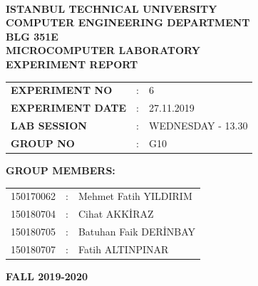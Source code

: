 \documentclass[pdftex,12pt,a4paper]{article}
\begin{document}
\begin{titlepage}
\begin{center}
\textbf{}\\
\textbf{\Large{ISTANBUL TECHNICAL UNIVERSITY}}\\
\vspace{0.5cm}
\textbf{\Large{COMPUTER ENGINEERING DEPARTMENT}}\\
\vspace{2cm}
\textbf{\Large{BLG 351E\\ MICROCOMPUTER LABORATORY\\ EXPERIMENT REPORT}}\\
\vspace{2.8cm}
\begin{table}[ht]
\centering
\Large{
\begin{tabular}{lcl}
\textbf{EXPERIMENT NO}  & : & 6 \\
\textbf{EXPERIMENT DATE}  & : & 27.11.2019 \\
\textbf{LAB SESSION}  & : & WEDNESDAY - 13.30 \\
\textbf{GROUP NO}  & : & G10 \\
\end{tabular}}
\end{table}
\vspace{1cm}
\textbf{\Large{GROUP MEMBERS:}}\\
\begin{table}[ht]
\centering
\Large{
\begin{tabular}{rcl}
150170062  & : & Mehmet Fatih YILDIRIM \\
150180704  & : & Cihat AKK\.{I}RAZ \\
150180705  & : & Batuhan Faik DER\.{I}NBAY \\
150180707  & : & Fatih ALTINPINAR \\
\end{tabular}}
\end{table}
\vspace{2.8cm}
\textbf{\Large{FALL 2019-2020}}

\end{center}

\end{titlepage}

\newpage


\thispagestyle{empty}
\setcounter{tocdepth}{4}
\tableofcontents
\clearpage

\setcounter{page}{1}
\end{document}
